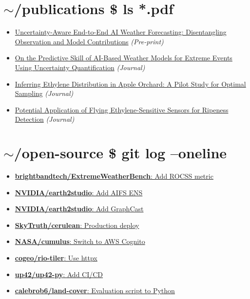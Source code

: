 \documentclass[a4paper,9pt]{article}
\begin{document}
\noindent
\begin{minipage}[t]{0.48\textwidth}
    \section*{\textcolor{promptcolor}{$\sim$/publications} \textcolor{commandcolor}{\$ ls *.pdf}}
    \begin{itemize}[leftmargin=*, noitemsep, topsep=0pt]
        \item \href{https://doi.org/10.48550/arXiv.2608.30795}{Uncertainty-Aware End-to-End AI Weather Forecasting: Disentangling Observation and Model Contributions} \textsl{(Pre-print)}
        \item \href{https://doi.org/10.1175/AIES-D-25-0113.1}{On the Predictive Skill of AI-Based Weather Models for Extreme Events Using Uncertainty Quantification} \textsl{(Journal)}
        \item \href{https://doi.org/10.1007/s13580-020-00316-9}{Inferring Ethylene Distribution in Apple Orchard: A Pilot Study for Optimal Sampling} \textsl{(Journal)}
        \item \href{https://doi.org/10.3390/s19020372}{Potential Application of Flying Ethylene-Sensitive Sensors for Ripeness Detection} \textsl{(Journal)}
    \end{itemize}
\end{minipage}
\hfill
\begin{minipage}[t]{0.48\textwidth}
    \section*{\textcolor{promptcolor}{$\sim$/open-source} \textcolor{commandcolor}{\$ git log --oneline}}
    \begin{itemize}[leftmargin=*, noitemsep, topsep=0pt]
        \item \href{https://github.com/brightbandtech/ExtremeWeatherBench/pull/284}{\textbf{brightbandtech/ExtremeWeatherBench}: Add ROCSS metric}
        \item \href{https://github.com/nvidia/earth2studio/pull/500}{\textbf{NVIDIA/earth2studio}: Add AIFS ENS}
        \item \href{https://github.com/nvidia/earth2studio/pull/256}{\textbf{NVIDIA/earth2studio}: Add GraphCast}
        \item \href{https://github.com/SkyTruth/cerulean-cloud/pull/60}{\textbf{SkyTruth/cerulean}: Production deploy}
        \item \href{https://github.com/NASA-IMPACT/csdap-cumulus/pull/8}{\textbf{NASA/cumulus}: Switch to AWS Cognito}
        \item \href{https://github.com/cogeotiff/rio-tiler/pull/431}{\textbf{cogeo/rio-tiler}: Use httpx}
        \item \href{https://github.com/up42/up42-py/pull/182}{\textbf{up42/up42-py}: Add CI/CD}
        \item \href{https://github.com/calebrob6/land-cover/pull/4}{\textbf{calebrob6/land-cover}: Evaluation script to Python}
    \end{itemize}
\end{minipage}
\end{document}
